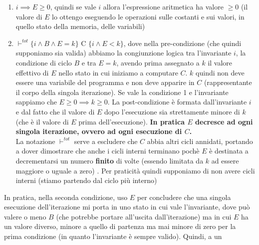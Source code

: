 				      				\begin{enumerate}
				      					\item $i\implies E\geq 0$, quindi se vale $i$ allora l'espressione aritmetica
				      					      ha valore $\geq 0$ (il valore di $E$ lo ottengo eseguendo le operazioni sulle
				      					      costanti e sui valori, in quello stato della memoria, delle variabili)
				      					      \label{ConditionTotalCorrectness1}
				      					\item $\vdash^{tot}\{i\land B\land E=k\}\mbox{ C }\{i\land E<k\}$, dove
				      					      nella pre-condizione (che quindi supponiamo sia valida) abbiamo la congiunzione logica tra l'invariante $i$, la
				      					      condizione di ciclo $B$ e tra $E=k$, avendo prima assegnato a $k$ il valore
				      					      effettivo di $E$ nello stato in cui iniziamo a computare $C$. $k$ quindi non
				      					      deve essere una variabile del programma e non deve apparire in $C$
				      					      (rappresentante il corpo della singola iterazione). Se vale la
				      					      condizione 1 e l'invariante sappiamo che $E\geq 0\implies k\geq 0$. La
				      					      post-condizione è formata dall'invariante $i$ e dal fatto che il valore di $E$
				      					      dopo l'esecuzione sia strettamente minore di $k$ (che è il valore di $E$ prima
				      					      dell'esecuzione). \textbf{In pratica $E$ decresce ad ogni singola iterazione, ovvero
				      					      	ad ogni esecuzione di $C$.}\\
				      					      La notazione $\vdash^{tot}$ serve a escludere che $C$ abbia altri cicli
				      					      annidati, portando a dover dimostrare che anche i cicli interni
				      					      terminano pochè $E$ è destinata a decrementarsi un numero \textbf{finito} di volte (essendo limitata da $k$ ad essere maggiore o uguale a zero) . Per praticità quindi supponiamo di non avere cicli interni (stiamo
				      					      partendo dal ciclo più interno)
				      					      \label{ConditionTotalCorrectness2}
				      				\end{enumerate}
				      				In pratica, nella seconda condizione, uso $E$ per concludere che una singola
				      				esecuzione dell'iterazione mi porta in uno stato in cui vale l'invariante, dove
				      				può valere o meno $B$ (che potrebbe portare all'uscita dall'iterazione) ma in
				      				cui $E$ ha un valore diverso, minore a quello di partenza ma mai minore di zero per
				      				la prima condizione (in quanto l'invariante è sempre valido). Quindi, a un
